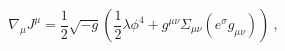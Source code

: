 \begin{equation}
\nabla_{\mu}J^{\mu} =\frac{1}{2}\sqrt{-g}(\frac{1}{2}\lambda
\phi^4 +g^{\mu\nu}\Sigma_{\mu\nu}(e^{\sigma}g_{\mu \nu}))~,
\label{6a}\end{equation} 
